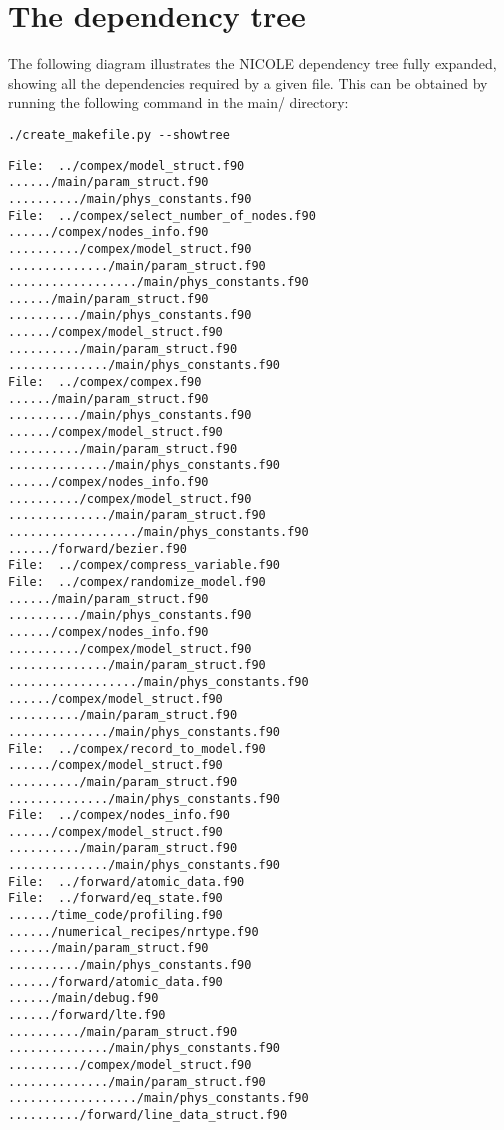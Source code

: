 \section{The dependency tree}
The following diagram illustrates the NICOLE dependency tree fully
expanded, showing all the dependencies required by a given file. This
can be obtained by running the following command in the main/
directory:
\begin{verbatim}
./create_makefile.py --showtree
\end{verbatim}

\begin{verbatim}
File:  ../compex/model_struct.f90
....../main/param_struct.f90
........../main/phys_constants.f90
File:  ../compex/select_number_of_nodes.f90
....../compex/nodes_info.f90
........../compex/model_struct.f90
............../main/param_struct.f90
................../main/phys_constants.f90
....../main/param_struct.f90
........../main/phys_constants.f90
....../compex/model_struct.f90
........../main/param_struct.f90
............../main/phys_constants.f90
File:  ../compex/compex.f90
....../main/param_struct.f90
........../main/phys_constants.f90
....../compex/model_struct.f90
........../main/param_struct.f90
............../main/phys_constants.f90
....../compex/nodes_info.f90
........../compex/model_struct.f90
............../main/param_struct.f90
................../main/phys_constants.f90
....../forward/bezier.f90
File:  ../compex/compress_variable.f90
File:  ../compex/randomize_model.f90
....../main/param_struct.f90
........../main/phys_constants.f90
....../compex/nodes_info.f90
........../compex/model_struct.f90
............../main/param_struct.f90
................../main/phys_constants.f90
....../compex/model_struct.f90
........../main/param_struct.f90
............../main/phys_constants.f90
File:  ../compex/record_to_model.f90
....../compex/model_struct.f90
........../main/param_struct.f90
............../main/phys_constants.f90
File:  ../compex/nodes_info.f90
....../compex/model_struct.f90
........../main/param_struct.f90
............../main/phys_constants.f90
File:  ../forward/atomic_data.f90
File:  ../forward/eq_state.f90
....../time_code/profiling.f90
....../numerical_recipes/nrtype.f90
....../main/param_struct.f90
........../main/phys_constants.f90
....../forward/atomic_data.f90
....../main/debug.f90
....../forward/lte.f90
........../main/param_struct.f90
............../main/phys_constants.f90
........../compex/model_struct.f90
............../main/param_struct.f90
................../main/phys_constants.f90
........../forward/line_data_struct.f90

\end{verbatim}
